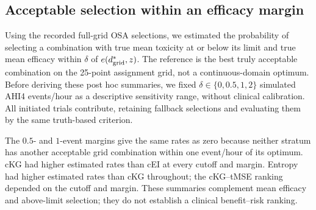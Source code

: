 \documentclass[11pt]{article}
\newcommand{\rev}[1]{{#1}}
\begin{document}
\subsection{\rev{Acceptable selection within an efficacy margin}}\label{sec:nearoptimal}

\rev{Using the recorded full-grid OSA selections, we estimated the probability of selecting a combination with true mean toxicity at or below its limit and true mean efficacy within $\delta$ of $e(d^*_{\rm grid},z)$. The reference is the best truly acceptable combination on the 25-point assignment grid, not a continuous-domain optimum. Before deriving these post hoc summaries, we fixed $\delta\in\{0,0.5,1,2\}$ simulated AHI4 events/hour as a descriptive sensitivity range, without clinical calibration. All initiated trials contribute, retaining fallback selections and evaluating them by the same truth-based criterion.}

\rev{The $0.5$- and $1$-event margins give the same rates as zero because neither stratum has another acceptable grid combination within one event/hour of its optimum. cKG had higher estimated rates than cEI at every cutoff and margin. Entropy had higher estimated rates than cKG throughout; the cKG--tMSE ranking depended on the cutoff and margin. These summaries complement mean efficacy and above-limit selection; they do not establish a clinical benefit--risk ranking.}
\end{document}
